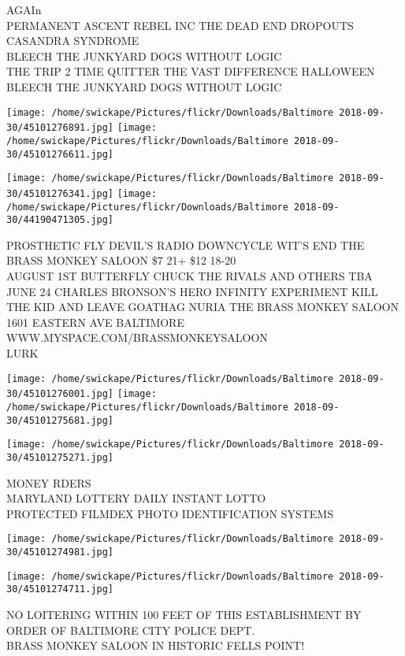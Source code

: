 \documentclass[10pt,letterpaper]{article}
\begin{document}
AGAIn\\
PERMANENT ASCENT REBEL INC THE DEAD END DROPOUTS CASANDRA SYNDROME\\
BLEECH THE JUNKYARD DOGS WITHOUT LOGIC\\
THE TRIP 2 TIME QUITTER THE VAST DIFFERENCE HALLOWEEN BLEECH THE JUNKYARD DOGS WITHOUT LOGIC
\pagebreak

\texttt{[image: /home/swickape/Pictures/flickr/Downloads/Baltimore 2018-09-30/45101276891.jpg]}
\texttt{[image: /home/swickape/Pictures/flickr/Downloads/Baltimore 2018-09-30/45101276611.jpg]}

\texttt{[image: /home/swickape/Pictures/flickr/Downloads/Baltimore 2018-09-30/45101276341.jpg]}
\texttt{[image: /home/swickape/Pictures/flickr/Downloads/Baltimore 2018-09-30/44190471305.jpg]}

PROSTHETIC FLY DEVIL'S RADIO DOWNCYCLE WIT'S END THE BRASS MONKEY SALOON \$7 21+ \$12 18{-}20\\
AUGUST 1ST BUTTERFLY CHUCK THE RIVALS AND OTHERS TBA\\
JUNE 24 CHARLES BRONSON'S HERO INFINITY EXPERIMENT KILL THE KID AND LEAVE GOATHAG NURIA THE BRASS MONKEY SALOON 1601 EASTERN AVE BALTIMORE WWW.MYSPACE.COM/BRASSMONKEYSALOON\\
LURK
\pagebreak

\texttt{[image: /home/swickape/Pictures/flickr/Downloads/Baltimore 2018-09-30/45101276001.jpg]}
\texttt{[image: /home/swickape/Pictures/flickr/Downloads/Baltimore 2018-09-30/45101275681.jpg]}

\vspace{0.25in}
\texttt{[image: /home/swickape/Pictures/flickr/Downloads/Baltimore 2018-09-30/45101275271.jpg]}

MONEY RDERS\\
MARYLAND LOTTERY DAILY INSTANT LOTTO\\
PROTECTED FILMDEX PHOTO IDENTIFICATION SYSTEMS
\pagebreak

\texttt{[image: /home/swickape/Pictures/flickr/Downloads/Baltimore 2018-09-30/45101274981.jpg]}

\vspace{0.25in}
\texttt{[image: /home/swickape/Pictures/flickr/Downloads/Baltimore 2018-09-30/45101274711.jpg]}

NO LOITERING WITHIN 100 FEET OF THIS ESTABLISHMENT BY ORDER OF BALTIMORE CITY POLICE DEPT.\\
BRASS MONKEY SALOON IN HISTORIC FELLS POINT!
\pagebreak
\end{document}
